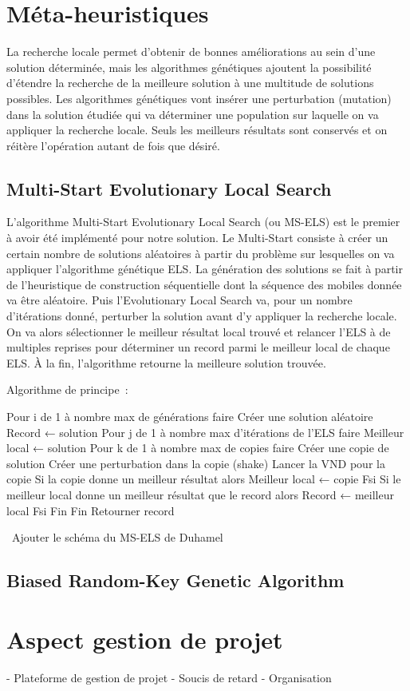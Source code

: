     \section{Méta-heuristiques}
    
    La recherche locale permet d'obtenir de bonnes améliorations au sein d'une solution déterminée, mais les algorithmes génétiques ajoutent la possibilité d'étendre la recherche de la meilleure solution à une multitude de solutions possibles.
	Les algorithmes génétiques vont insérer une perturbation (mutation) dans la solution étudiée qui va déterminer une population sur laquelle on va appliquer la recherche locale. Seuls les meilleurs résultats sont conservés et on réitère l'opération autant de fois que désiré.
	
    	\subsection{Multi-Start Evolutionary Local Search}
    	
    	L'algorithme Multi-Start Evolutionary Local Search (ou MS-ELS) est le premier  à avoir été implémenté pour notre solution. Le Multi-Start consiste à créer un certain nombre de solutions aléatoires à partir du problème sur lesquelles on va appliquer l'algorithme génétique ELS. La génération des solutions se fait à partir de l'heuristique de construction séquentielle dont la séquence des mobiles donnée va être aléatoire.
		Puis l'Evolutionary Local Search va, pour un nombre d'itérations donné, perturber la solution avant d'y appliquer la recherche locale. On va alors sélectionner le meilleur résultat local trouvé et relancer l'ELS à de multiples reprises pour déterminer un record parmi le meilleur local de chaque ELS.
		À la fin, l'algorithme retourne la meilleure solution trouvée.
		
		Algorithme de principe :
		
Pour i de 1 à nombre max de générations faire
	Créer une solution aléatoire
	Record ← solution
	Pour j de 1 à nombre max d'itérations de l'ELS faire
		Meilleur local ← solution
		Pour k de 1 à nombre max de copies faire
			Créer une copie de solution
			Créer une perturbation dans la copie (shake)
			Lancer la VND pour la copie
			Si la copie donne un meilleur résultat alors
				Meilleur local ← copie
			Fsi
		Si le meilleur local donne un meilleur résultat que le record alors
			Record ← meilleur local
		Fsi
	Fin
Fin
Retourner record

\TODO Ajouter le schéma du MS-ELS de Duhamel

    	\subsection{Biased Random-Key Genetic Algorithm}
    \section{Aspect gestion de projet}
    
	- Plateforme de gestion de projet
	- Soucis de retard
	- Organisation
